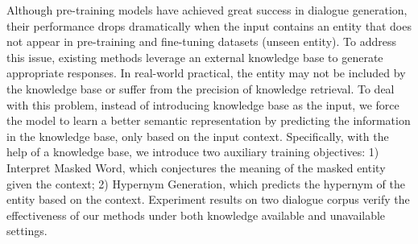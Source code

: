 Although pre-training models have achieved great success in dialogue generation, their performance drops dramatically when the input contains an entity that does not appear in pre-training and fine-tuning datasets (unseen entity). To address this issue, existing methods leverage an external knowledge base to generate appropriate responses. In real-world practical, the entity may not be included by the knowledge base or suffer from the precision of knowledge retrieval. To deal with this problem, instead of introducing knowledge base as the input, we force the model to learn a better semantic representation by predicting the information in the knowledge base, only based on the input context. Specifically, with the help of a knowledge base, we introduce two auxiliary training objectives: 1) Interpret Masked Word, which conjectures the meaning of the masked entity given the context; 2) Hypernym Generation, which predicts the hypernym of the entity based on the context. Experiment results on two dialogue corpus verify the effectiveness of our methods under both knowledge available and unavailable settings.
